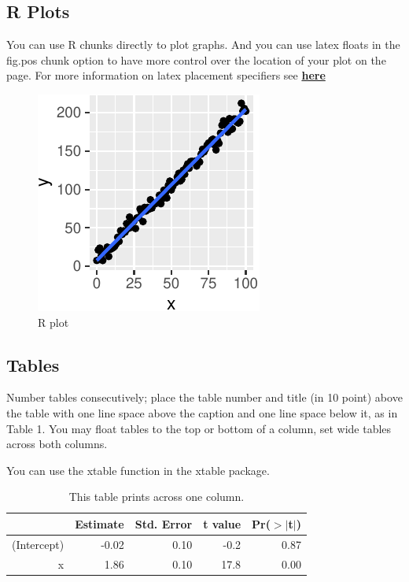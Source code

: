 \documentclass[10pt, letterpaper]{article}
\newenvironment{CodeChunk}{}{}
\begin{document}
\hypertarget{r-plots}{%
\subsection{R Plots}\label{r-plots}}

You can use R chunks directly to plot graphs. And you can use latex
floats in the fig.pos chunk option to have more control over the
location of your plot on the page. For more information on latex
placement specifiers see
\textbf{\href{https://en.wikibooks.org/wiki/LaTeX/Floats,_Figures_and_Captions}{here}}

\begin{CodeChunk}
\begin{figure}[H]

{\centering \includegraphics{figs/plot-1} 

}

\caption[R plot]{R plot}\label{fig:plot}
\end{figure}
\end{CodeChunk}

\hypertarget{tables}{%
\subsection{Tables}\label{tables}}

Number tables consecutively; place the table number and title (in 10
point) above the table with one line space above the caption and one
line space below it, as in Table 1. You may float tables to the top or
bottom of a column, set wide tables across both columns.

You can use the xtable function in the xtable package.

\begin{table}[H]
\centering
\begin{tabular}{rrrrr}
  \hline
 & Estimate & Std. Error & t value & Pr($>$$|$t$|$) \\ 
  \hline
(Intercept) & -0.02 & 0.10 & -0.2 & 0.87 \\ 
  x & 1.86 & 0.10 & 17.8 & 0.00 \\ 
   \hline
\end{tabular}
\caption{This table prints across one column.} 
\end{table}
\end{document}
